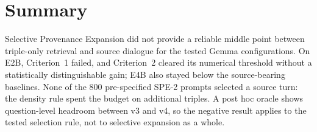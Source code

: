\section{Summary}
\label{sec:spe_summary}

Selective Provenance Expansion did not provide a reliable middle point between triple-only retrieval
and source dialogue for the tested Gemma configurations. On E2B, Criterion~1 failed, and Criterion~2
cleared its numerical threshold without a statistically distinguishable gain; E4B also stayed below
the source-bearing baselines. None of the 800 pre-specified SPE-2 prompts selected a source turn: the
density rule spent the budget on additional triples. A post hoc oracle shows question-level headroom
between v3 and v4, so the negative result applies to the tested selection rule, not to selective
expansion as a whole.
